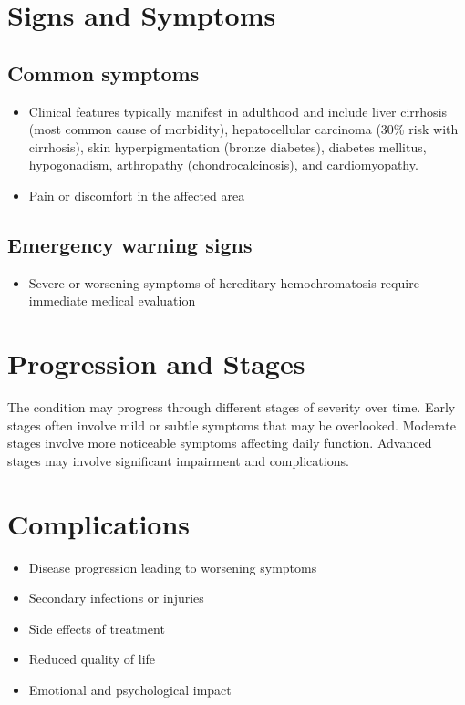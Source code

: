 \section{Signs and Symptoms}

\subsection{Common symptoms}
\begin{itemize}[noitemsep]
  \item Clinical features typically manifest in adulthood and include liver cirrhosis (most common cause of morbidity), hepatocellular carcinoma (30\% risk with cirrhosis), skin hyperpigmentation (bronze diabetes), diabetes mellitus, hypogonadism, arthropathy (chondrocalcinosis), and cardiomyopathy.
  \item Pain or discomfort in the affected area
  \end{itemize}

\subsection{Emergency warning signs}
\begin{itemize}[noitemsep]
  \item Severe or worsening symptoms of hereditary hemochromatosis require immediate medical evaluation
\end{itemize}
\section{Progression and Stages}
The condition may progress through different stages of severity over time. Early stages often involve mild or subtle symptoms that may be overlooked. Moderate stages involve more noticeable symptoms affecting daily function. Advanced stages may involve significant impairment and complications.
\section{Complications}
\begin{itemize}[noitemsep]
  \item Disease progression leading to worsening symptoms
  \item Secondary infections or injuries
  \item Side effects of treatment
  \item Reduced quality of life
  \item Emotional and psychological impact
\end{itemize}
